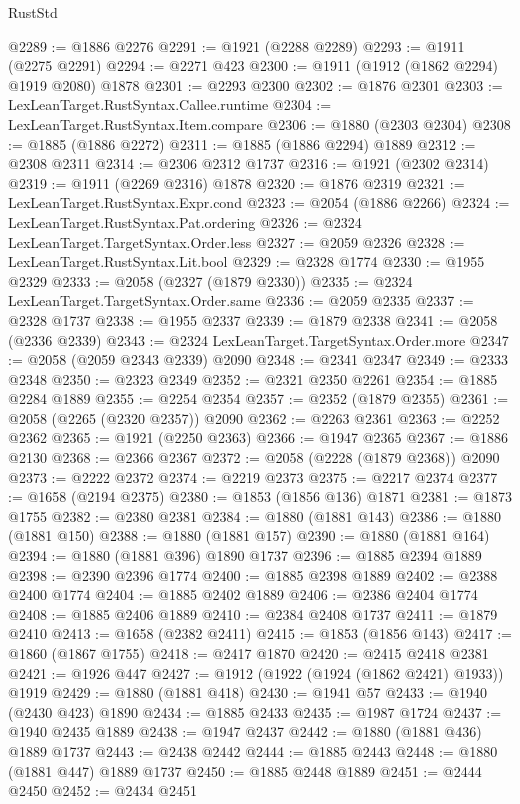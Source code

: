 \begin{lexlean}{RustStd}
\begin{coremodule}
@2289 := @1886 @2276
@2291 := @1921 (@2288 @2289)
@2293 := @1911 (@2275 @2291)
@2294 := @2271 @423
@2300 := @1911 (@1912 (@1862 @2294) @1919 @2080) @1878
@2301 := @2293 @2300
@2302 := @1876 @2301
@2303 := LexLeanTarget.RustSyntax.Callee.runtime
@2304 := LexLeanTarget.RustSyntax.Item.compare
@2306 := @1880 (@2303 @2304)
@2308 := @1885 (@1886 @2272)
@2311 := @1885 (@1886 @2294) @1889
@2312 := @2308 @2311
@2314 := @2306 @2312 @1737
@2316 := @1921 (@2302 @2314)
@2319 := @1911 (@2269 @2316) @1878
@2320 := @1876 @2319
@2321 := LexLeanTarget.RustSyntax.Expr.cond
@2323 := @2054 (@1886 @2266)
@2324 := LexLeanTarget.RustSyntax.Pat.ordering
@2326 := @2324 LexLeanTarget.TargetSyntax.Order.less
@2327 := @2059 @2326
@2328 := LexLeanTarget.RustSyntax.Lit.bool
@2329 := @2328 @1774
@2330 := @1955 @2329
@2333 := @2058 (@2327 (@1879 @2330))
@2335 := @2324 LexLeanTarget.TargetSyntax.Order.same
@2336 := @2059 @2335
@2337 := @2328 @1737
@2338 := @1955 @2337
@2339 := @1879 @2338
@2341 := @2058 (@2336 @2339)
@2343 := @2324 LexLeanTarget.TargetSyntax.Order.more
@2347 := @2058 (@2059 @2343 @2339) @2090
@2348 := @2341 @2347
@2349 := @2333 @2348
@2350 := @2323 @2349
@2352 := @2321 @2350 @2261
@2354 := @1885 @2284 @1889
@2355 := @2254 @2354
@2357 := @2352 (@1879 @2355)
@2361 := @2058 (@2265 (@2320 @2357)) @2090
@2362 := @2263 @2361
@2363 := @2252 @2362
@2365 := @1921 (@2250 @2363)
@2366 := @1947 @2365
@2367 := @1886 @2130
@2368 := @2366 @2367
@2372 := @2058 (@2228 (@1879 @2368)) @2090
@2373 := @2222 @2372
@2374 := @2219 @2373
@2375 := @2217 @2374
@2377 := @1658 (@2194 @2375)
@2380 := @1853 (@1856 @136) @1871
@2381 := @1873 @1755
@2382 := @2380 @2381
@2384 := @1880 (@1881 @143)
@2386 := @1880 (@1881 @150)
@2388 := @1880 (@1881 @157)
@2390 := @1880 (@1881 @164)
@2394 := @1880 (@1881 @396) @1890 @1737
@2396 := @1885 @2394 @1889
@2398 := @2390 @2396 @1774
@2400 := @1885 @2398 @1889
@2402 := @2388 @2400 @1774
@2404 := @1885 @2402 @1889
@2406 := @2386 @2404 @1774
@2408 := @1885 @2406 @1889
@2410 := @2384 @2408 @1737
@2411 := @1879 @2410
@2413 := @1658 (@2382 @2411)
@2415 := @1853 (@1856 @143)
@2417 := @1860 (@1867 @1755)
@2418 := @2417 @1870
@2420 := @2415 @2418 @2381
@2421 := @1926 @447
@2427 := @1912 (@1922 (@1924 (@1862 @2421) @1933)) @1919
@2429 := @1880 (@1881 @418)
@2430 := @1941 @57
@2433 := @1940 (@2430 @423) @1890
@2434 := @1885 @2433
@2435 := @1987 @1724
@2437 := @1940 @2435 @1889
@2438 := @1947 @2437
@2442 := @1880 (@1881 @436) @1889 @1737
@2443 := @2438 @2442
@2444 := @1885 @2443
@2448 := @1880 (@1881 @447) @1889 @1737
@2450 := @1885 @2448 @1889
@2451 := @2444 @2450
@2452 := @2434 @2451

\end{coremodule}
\end{lexlean}
